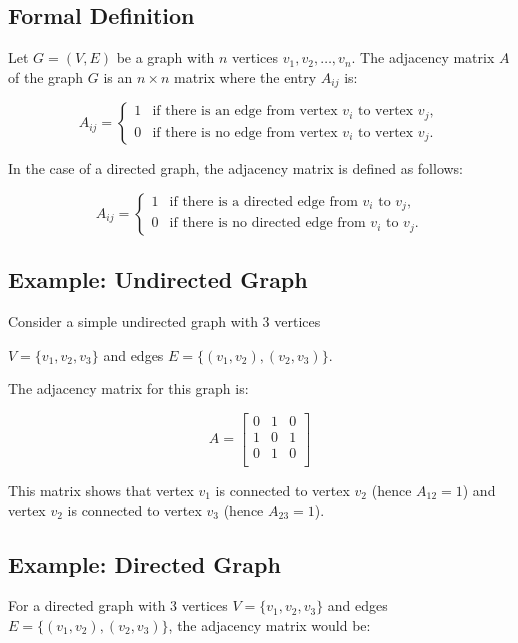 \documentclass{book}
\begin{document}
\subsection{Formal Definition}

Let \( G = (V, E) \) be a graph with \(n\) vertices \(v_1, v_2, \dots, v_n\). The adjacency matrix \(A\) of the graph \(G\) is an \(n \times n\) matrix where the entry \(A_{ij}\) is:

\[
A_{ij} =
\begin{cases}
1 & \text{if there is an edge from vertex } v_i \text{ to vertex } v_j, \\
0 & \text{if there is no edge from vertex } v_i \text{ to vertex } v_j.
\end{cases}
\]

In the case of a directed graph, the adjacency matrix is defined as follows:

\[
A_{ij} = 
\begin{cases} 
1 & \text{if there is a directed edge from } v_i \text{ to } v_j, \\
0 & \text{if there is no directed edge from } v_i \text{ to } v_j.
\end{cases}
\]

\subsection{Example: Undirected Graph}

Consider a simple undirected graph with 3 vertices 

\(V = \{v_1, v_2, v_3\}\) and edges \(E = \{(v_1, v_2), (v_2, v_3)\}\). 

The adjacency matrix for this graph is:

\[
A = \begin{bmatrix}
0 & 1 & 0 \\
1 & 0 & 1 \\
0 & 1 & 0 \\
\end{bmatrix}
\]

This matrix shows that vertex \(v_1\) is connected to vertex \(v_2\) (hence \(A_{12} = 1\)) and vertex \(v_2\) is connected to vertex \(v_3\) (hence \(A_{23} = 1\)).

\subsection{Example: Directed Graph}

For a directed graph with 3 vertices \(V = \{v_1, v_2, v_3\}\) and edges \(E = \{(v_1, v_2), (v_2, v_3)\}\), the adjacency matrix would be:
\end{document}
